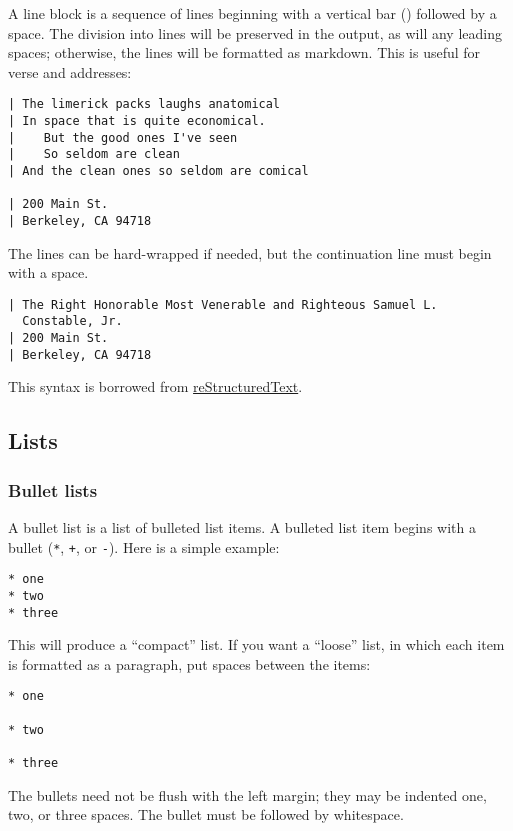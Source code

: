 \documentclass[]{article}
\begin{document}
A line block is a sequence of lines beginning with a vertical bar
(\texttt{\textbar{}}) followed by a space. The division into lines will
be preserved in the output, as will any leading spaces; otherwise, the
lines will be formatted as markdown. This is useful for verse and
addresses:

\begin{verbatim}
| The limerick packs laughs anatomical
| In space that is quite economical.
|    But the good ones I've seen
|    So seldom are clean
| And the clean ones so seldom are comical

| 200 Main St.
| Berkeley, CA 94718
\end{verbatim}

The lines can be hard-wrapped if needed, but the continuation line must
begin with a space.

\begin{verbatim}
| The Right Honorable Most Venerable and Righteous Samuel L.
  Constable, Jr.
| 200 Main St.
| Berkeley, CA 94718
\end{verbatim}

This syntax is borrowed from
\href{http://docutils.sourceforge.net/docs/ref/rst/introduction.html}{reStructuredText}.

\subsection{Lists}

\subsubsection{Bullet lists}

A bullet list is a list of bulleted list items. A bulleted list item
begins with a bullet (\texttt{*}, \texttt{+}, or \texttt{-}). Here is a
simple example:

\begin{verbatim}
* one
* two
* three
\end{verbatim}

This will produce a ``compact'' list. If you want a ``loose'' list, in
which each item is formatted as a paragraph, put spaces between the
items:

\begin{verbatim}
* one

* two

* three
\end{verbatim}

The bullets need not be flush with the left margin; they may be indented
one, two, or three spaces. The bullet must be followed by whitespace.
\end{document}
